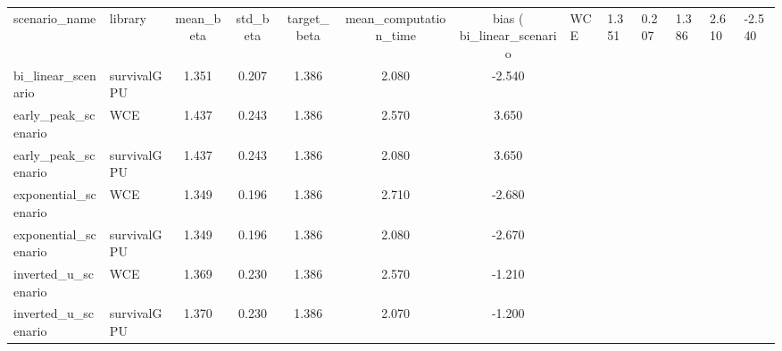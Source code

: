 \begin{tabular}{|l|l|c|c|c|c|c|}
\toprule
scenario_name & library & mean_beta & std_beta & target_beta & mean_computation_time & bias (%
\midrule
bi_linear_scenario & WCE & 1.351 & 0.207 & 1.386 & 2.610 & -2.540 \\
bi_linear_scenario & survivalGPU & 1.351 & 0.207 & 1.386 & 2.080 & -2.540 \\
early_peak_scenario & WCE & 1.437 & 0.243 & 1.386 & 2.570 & 3.650 \\
early_peak_scenario & survivalGPU & 1.437 & 0.243 & 1.386 & 2.080 & 3.650 \\
exponential_scenario & WCE & 1.349 & 0.196 & 1.386 & 2.710 & -2.680 \\
exponential_scenario & survivalGPU & 1.349 & 0.196 & 1.386 & 2.080 & -2.670 \\
inverted_u_scenario & WCE & 1.369 & 0.230 & 1.386 & 2.570 & -1.210 \\
inverted_u_scenario & survivalGPU & 1.370 & 0.230 & 1.386 & 2.070 & -1.200 \\
\bottomrule
\end{tabular}

